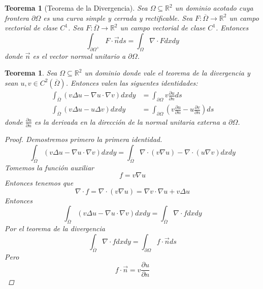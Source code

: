 \documentclass[11pt]{book}
\theoremstyle{plain}
\newtheorem{teo}[proposición]{Teorema}
\theoremstyle{definition}
\newcommand{\R}{\mathbb{R}}
\begin{document}
    \begin{teo}[Teorema de la Divergencia]
        Sea $\Omega \subseteq \R^{2}$ un dominio acotado cuya frontera $\partial \Omega$ es una curva simple y cerrada y rectificable. Sea $F : \overline{\Omega} \to \R^{2}$ un campo vectorial de clase $C^{1}$. Sea $F : \overline{\Omega} \to \R^{2}$ un campo vectorial de clase $C^{1}$. Entonces
        \[
            \int_{\partial \Omega ^{+}} F \cdot \overrightarrow{n}ds = \int_{\Omega} \nabla \cdot F dxdy  
        \]
        donde $\overrightarrow{n}$ es el vector normal unitario a $\partial \Omega$.
    \end{teo}
    \begin{teo}
        Sea $\Omega \subseteq \R^{2}$ un dominio donde vale el teorema de la divergencia y sean $u, v \in C^{2}(\overline{\Omega})$. Entonces valen las siguentes identidades:
        \begin{align*}
            \int_{\overline{\Omega}} \left(v \Delta u - \nabla u \cdot \nabla v\right)dxdy &= \int_{\partial \Omega} v \frac{\partial u}{\partial n}ds\\
            \int_{\overline{\Omega}} \left(v \Delta u - u \Delta v\right)dxdy &= \int_{\partial \Omega} \left(v \frac{\partial u}{\partial n} - u \frac{\partial v}{\partial n}\right)ds
        \end{align*}
        donde $\frac{\partial u}{\partial n}$ es la derivada en la dirección de la normal unitaria externa a $\partial \Omega$.
        \begin{proof}
            Demostremos primero la primera identidad.
            \[
                \int_{\overline{\Omega}} \left(v \Delta u - \nabla u \cdot \nabla v\right)dxdy = \int_{\overline{\Omega}} \nabla \cdot (v\nabla u) - \nabla \cdot (u\nabla v)dxdy
            \]
            Tomemos la función auxiliar
            \[
                f = v\nabla u  
            \]
            Entonces tenemos que
            \[
                \nabla \cdot f = \nabla \cdot (v\nabla u) = \nabla v \cdot \nabla u + v \Delta u
            \]
            Entonces
            \[
                \int_{\overline{\Omega}} \left(v \Delta u - \nabla u \cdot \nabla v\right)dxdy = \int_{\overline{\Omega}} \nabla \cdot f dxdy
            \]
            Por el teorema de la divergencia
            \[
                \int_{\overline{\Omega}} \nabla \cdot f dxdy = \int_{\partial \Omega} f \cdot \overrightarrow{n}ds
            \]
            Pero
            \[
                f \cdot \overrightarrow{n} = v \frac{\partial u}{\partial n}
            \]

\end{proof}
\end{teo}
\end{document}
